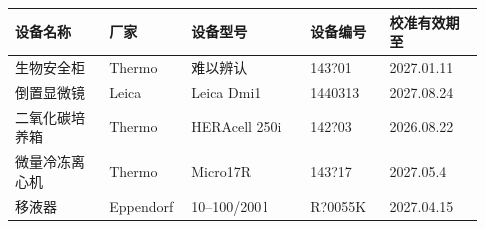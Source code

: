 \documentclass[UTF8,10pt,a4paper,fontset=fandol]{ctexart}
\newcommand{\fieldvalue}[1]{#1}
\newcommand{\handwritten}[1]{#1}
\begin{document}
\begin{tabular}{|p{0.19\linewidth}|p{0.15\linewidth}|p{0.24\linewidth}|p{0.16\linewidth}|p{0.19\linewidth}|}
\hline
设备名称 & 厂家 & 设备型号 & 设备编号 & 校准有效期至 \\
\hline
生物安全柜 &
\fieldvalue{Thermo} &
\fieldvalue{\handwritten{难以辨认}} &
\fieldvalue{\handwritten{143?01}} &
\fieldvalue{\handwritten{2027.01.11}} \\
\hline
倒置显微镜 &
\fieldvalue{Leica} &
\fieldvalue{Leica Dmi1} &
\fieldvalue{\handwritten{1440313}} &
\fieldvalue{\handwritten{2027.08.24}} \\
\hline
二氧化碳培养箱 &
\fieldvalue{Thermo} &
\fieldvalue{HERAcell 250i} &
\fieldvalue{\handwritten{142?03}} &
\fieldvalue{\handwritten{2026.08.22}} \\
\hline
微量冷冻离心机 &
\fieldvalue{Thermo} &
\fieldvalue{Micro17R} &
\fieldvalue{\handwritten{143?17}} &
\fieldvalue{\handwritten{2027.05.4}} \\
\hline
移液器 &
\fieldvalue{Eppendorf} &
\fieldvalue{\handwritten{10--100/200\,\textmu l}} &
\fieldvalue{\handwritten{R?0055K}} &
\fieldvalue{\handwritten{2027.04.15}} \\
\hline
\end{tabular}
\end{document}

